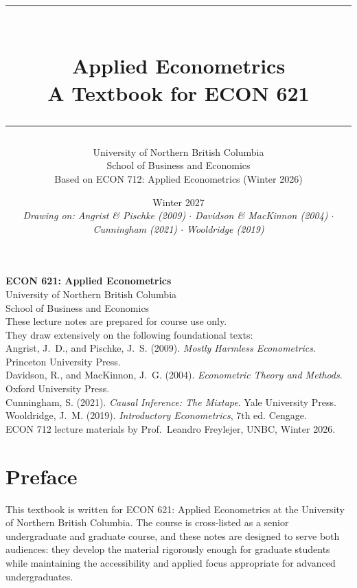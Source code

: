 \documentclass[11pt, twoside, openright]{book}
\title{%
  \vspace{-1cm}
  {\color{econblue}\rule{\textwidth}{2pt}}\\[0.5em]
  {\Huge\bfseries\color{econblue} Applied Econometrics}\\[0.4em]
  {\large A Textbook for ECON 621}\\[0.3em]
  {\color{econblue}\rule{\textwidth}{1pt}}
}
\author{%
  University of Northern British Columbia\\[0.3em]
  School of Business and Economics\\[0.5em]
  \small Based on ECON 712: Applied Econometrics (Winter 2026)
}
\date{%
  \small Winter 2027\\[0.5em]
  \small\itshape Drawing on: Angrist \& Pischke (2009) $\cdot$
         Davidson \& MacKinnon (2004) $\cdot$
         Cunningham (2021) $\cdot$ Wooldridge (2019)
}
\theoremstyle{econstyle}
\theoremstyle{defstyle}
\begin{document}
\frontmatter

\maketitle
\thispagestyle{empty}

\newpage
\thispagestyle{empty}
\vspace*{\fill}
\begin{center}
{\small
\textbf{ECON 621: Applied Econometrics}\\
University of Northern British Columbia\\
School of Business and Economics\\[1em]
These lecture notes are prepared for course use only.\\
They draw extensively on the following foundational texts:\\[0.5em]
Angrist, J.~D., and Pischke, J.~S. (2009).
\textit{Mostly Harmless Econometrics}. Princeton University Press.\\[0.2em]
Davidson, R., and MacKinnon, J.~G. (2004).
\textit{Econometric Theory and Methods}. Oxford University Press.\\[0.2em]
Cunningham, S. (2021). \textit{Causal Inference: The Mixtape}. Yale University Press.\\[0.2em]
Wooldridge, J.~M. (2019). \textit{Introductory Econometrics}, 7th ed. Cengage.\\[1em]
ECON 712 lecture materials by Prof.\ Leandro Freylejer, UNBC, Winter 2026.
}
\end{center}
\vspace*{\fill}

\tableofcontents

\chapter*{Preface}

This textbook is written for ECON 621: Applied Econometrics at the University of Northern British Columbia.
The course is cross-listed as a senior undergraduate and graduate course, and these notes are designed to
serve both audiences: they develop the material rigorously enough for graduate students while maintaining
the accessibility and applied focus appropriate for advanced undergraduates.
\end{document}
